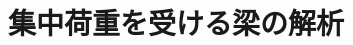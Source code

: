 \documentclass[10pt,a4j]{jbook}
\newlength{\minitwocolumn}
\begin{document}
\newcommand{\fat}[1]{\mbox{\boldmath $#1$}}
\newcommand{\D}{\partial}
\newcommand{\w}{\omega}
\newcommand{\ga}{\alpha}
\newcommand{\gb}{\beta}
\newcommand{\gx}{\xi}
\newcommand{\gz}{\zeta}
\newcommand{\vhat}[1]{\hat{\fat{#1}}}
\newcommand{\spc}{\vspace{0.7\baselineskip}}
\newcommand{\halfspc}{\vspace{0.3\baselineskip}}

\newcommand{\twofig}[2]
 {
   \begin{figure}
     \begin{minipage}[t]{\minitwocolumn}
         \begin{center}   #1
         \end{center}
     \end{minipage}
         \hspace{\columnsep}
     \begin{minipage}[t]{\minitwocolumn}
         \begin{center} #2
         \end{center}
     \end{minipage}
   \end{figure}
 }
\setcounter{chapter}{4}
\chapter{集中荷重を受ける梁の解析}
\end{document}
